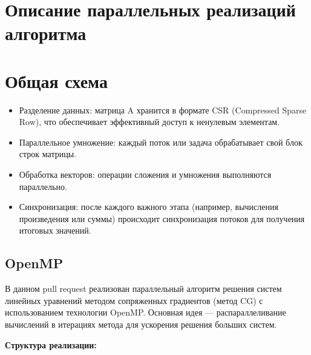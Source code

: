\documentclass[12pt]{article}
\begin{document}
\section{Описание параллельных реализаций алгоритма}

\section*{Общая схема}
\begin{itemize}
\item Разделение данных: матрица A хранится в формате CSR (Compressed Sparse Row), что обеспечивает эффективный доступ к ненулевым элементам.
\item Параллельное умножение: каждый поток или задача обрабатывает свой блок строк матрицы.
\item Обработка векторов: операции сложения и умножения выполняются параллельно.
\item Синхронизация: после каждого важного этапа (например, вычисления произведения или суммы) происходит синхронизация потоков для получения итоговых значений.
\end{itemize}

\subsection{OpenMP}

В данном pull request реализован параллельный алгоритм решения систем линейных уравнений методом сопряженных градиентов (метод CG) с использованием технологии OpenMP. Основная идея — распараллеливание вычислений в итерациях метода для ускорения решения больших систем.

\textbf{Структура реализации:}
\end{document}
